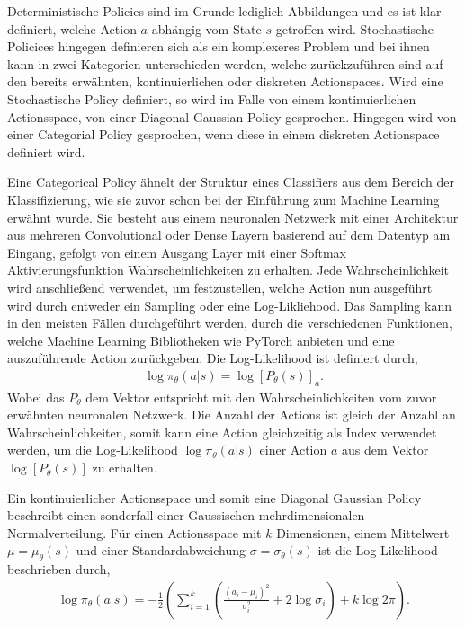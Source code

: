\documentclass[]{iat}
\begin{document}
Deterministische Policies sind im Grunde lediglich Abbildungen und es ist klar definiert, welche Action $a$ abhängig vom State $s$ getroffen wird. Stochastische Policices hingegen definieren sich als ein komplexeres Problem und bei ihnen kann in zwei Kategorien unterschieden werden, welche zurückzuführen sind auf den bereits erwähnten, kontinuierlichen oder diskreten Actionspaces. Wird eine Stochastische Policy definiert, so wird im Falle von einem kontinuierlichen Actionsspace, von einer Diagonal Gaussian Policy gesprochen. Hingegen wird von einer Categorial Policy gesprochen, wenn diese in einem diskreten Actionspace definiert wird.

Eine Categorical Policy ähnelt der Struktur eines Classifiers aus dem Bereich der Klassifizierung, wie sie zuvor schon bei der Einführung zum Machine Learning erwähnt wurde. Sie besteht aus einem neuronalen Netzwerk mit einer Architektur aus mehreren Convolutional oder Dense Layern basierend auf dem Datentyp am Eingang, gefolgt von einem Ausgang Layer mit einer Softmax Aktivierungsfunktion Wahrscheinlichkeiten zu erhalten. Jede Wahrscheinlichkeit wird anschließend verwendet, um festzustellen, welche Action nun ausgeführt wird durch entweder ein Sampling oder eine Log-Likliehood. Das Sampling kann in den meisten Fällen durchgeführt werden, durch die verschiedenen Funktionen, welche Machine Learning Bibliotheken wie PyTorch \cite[]{pytorch} anbieten und eine auszuführende Action zurückgeben. Die Log-Likelihood ist definiert durch,
\begin{align}
    \log \pi_\theta (a|s) = \log\left[P_\theta(s)\right]_a.
\end{align}
Wobei das $P_\theta$ dem Vektor entspricht mit den Wahrscheinlichkeiten vom zuvor erwähnten neuronalen Netzwerk. Die Anzahl der Actions ist gleich der Anzahl an Wahrscheinlichkeiten, somit kann eine Action gleichzeitig als Index verwendet werden, um die Log-Likelihood $\log \pi_\theta (a|s)$ einer Action $a$ aus dem Vektor $\log\left[P_\theta(s)\right]$ zu erhalten.

Ein kontinuierlicher Actionsspace und somit eine Diagonal Gaussian Policy beschreibt einen sonderfall einer Gaussischen mehrdimensionalen Normalverteilung. Für einen Actionsspace mit $k$ Dimensionen, einem Mittelwert $\mu = \mu_{\theta}(s)$ und einer Standardabweichung $\sigma = \sigma_{\theta}(s)$ ist die Log-Likelihood beschrieben durch,
\begin{align}
    \log \pi_\theta (a|s) = -\frac{1}{2} \left(\sum_{i = 1}^{k} \left( \frac{(a_i-\mu_i)^2}{\sigma_i^2}+2 \log \sigma_i\right) + k \log 2 \pi \right). \label{eq:dg_log_loglikelihood}
\end{align}
\cite[]{SpinningUp2018}
\end{document}
